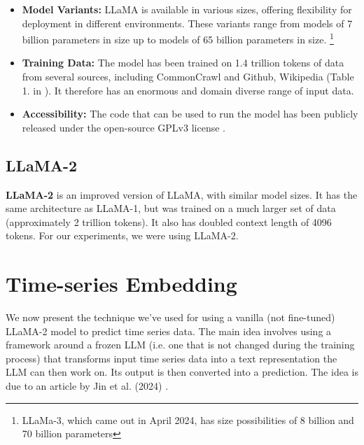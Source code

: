 \begin{itemize}
	\item \textbf{Model Variants:} LLaMA is available in various sizes, offering flexibility for deployment in different environments. These variants range from models of 7 billion parameters in size up to models of 65 billion parameters in size. \footnote{LLaMa-3, which came out in April 2024, has size possibilities of 8 billion and 70 billion parameters}

	\item \textbf{Training Data:} The model has been trained on 1.4 trillion tokens of data from several sources, including CommonCrawl and Github, Wikipedia (Table 1. in \cite{llama}). It therefore has an enormous and domain diverse range of input data.


	\item \textbf{Accessibility:} The code that can be used to run the model has been publicly released under the open-source GPLv3 license \cite{llama_code}.
\end{itemize}

\subsection{LLaMA-2}
\textbf{LLaMA-2} \cite{llama2} is an improved version of LLaMA, with similar model sizes. It has the same architecture as LLaMA-1, but was trained on a much larger set of data (approximately 2 trillion tokens). It also has doubled context length of 4096 tokens. For our experiments, we were using LLaMA-2.

\section{Time-series Embedding}
We now present the technique we've used for using a vanilla (not fine-tuned) LLaMA-2 model to predict time series data.
The main idea involves using a framework around a frozen LLM (i.e. one that is not changed during the training process) that transforms input time series data into a text representation the LLM can then work on. Its output is then converted into a prediction. The idea is due to an article by Jin et al. (2024) \cite{reprogramming_llm}.

